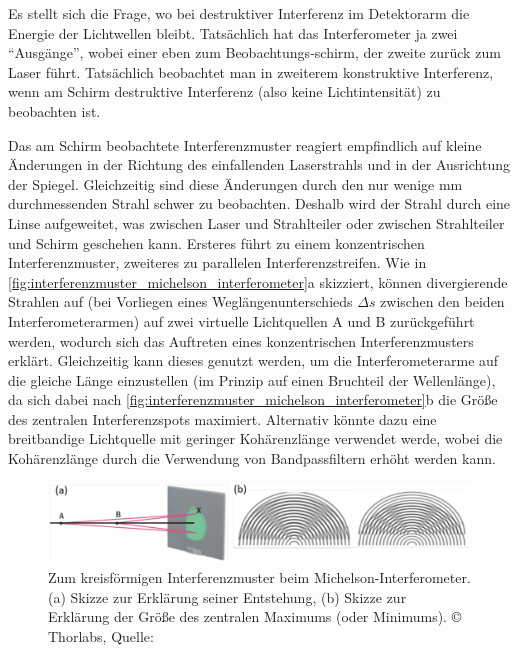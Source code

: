 \documentclass[ngerman]{scrartcl}
\begin{document}
Es stellt sich die Frage, wo bei destruktiver Interferenz im Detektorarm die Energie der Lichtwellen bleibt. Tatsächlich hat das Interferometer ja zwei \enquote{Ausgänge}, wobei einer eben zum Beobachtungs-schirm, der zweite zurück zum Laser führt. Tatsächlich beobachtet man in zweiterem konstruktive Interferenz, wenn am Schirm destruktive Interferenz (also keine Lichtintensität) zu beobachten ist.

Das am Schirm beobachtete Interferenzmuster reagiert empfindlich auf kleine Änderungen in der Richtung des einfallenden Laserstrahls und in der Ausrichtung der Spiegel. Gleichzeitig sind diese Änderungen durch den nur wenige mm durchmessenden Strahl schwer zu beobachten. Deshalb wird der Strahl durch eine Linse aufgeweitet, was zwischen Laser und Strahlteiler oder zwischen Strahlteiler und Schirm geschehen kann. Ersteres führt zu einem konzentrischen Interferenzmuster, zweiteres zu parallelen Interferenzstreifen. Wie in \autoref{fig:interferenzmuster_michelson_interferometer}a skizziert, können divergierende Strahlen auf (bei Vorliegen eines Weglängenunterschieds $\Delta s$ zwischen den beiden Interferometerarmen) auf zwei virtuelle Lichtquellen A und B zurückgeführt werden, wodurch sich das Auftreten eines konzentrischen Interferenzmusters erklärt. Gleichzeitig kann dieses genutzt werden, um die Interferometerarme auf die gleiche Länge einzustellen (im Prinzip auf einen Bruchteil der Wellenlänge), da sich dabei nach \autoref{fig:interferenzmuster_michelson_interferometer}b die Größe des zentralen Interferenzspots maximiert. Alternativ könnte dazu eine breitbandige Lichtquelle mit geringer Kohärenzlänge verwendet werde, wobei die Kohärenzlänge durch die Verwendung von Bandpassfiltern erhöht werden kann.

\begin{figure}[H]
    \centering
    \begin{samepage}
        \includegraphics[width=\linewidth]{fig/Compressed/Angabe_Abb9.png}
        \caption[Interferenzmuster Michelson-Interferometer]{Zum kreisförmigen Interferenzmuster beim Michelson-Interferometer. (a) Skizze zur Erklärung seiner Entstehung, (b) Skizze zur Erklärung der Größe des zentralen Maximums (oder Minimums). \copyright{} Thorlabs, Quelle: \cite{ref:angabe}}
        \label{fig:interferenzmuster_michelson_interferometer}
    \end{samepage}
\end{figure}
\end{document}
